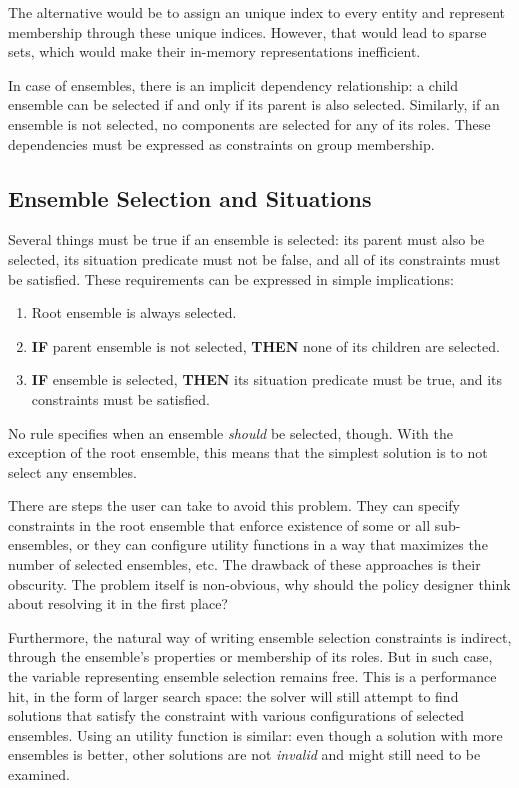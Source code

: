 The alternative would be to assign an unique index to every entity and represent
membership through these unique indices. However, that would lead to sparse sets, which
would make their in-memory representations inefficient.

In case of ensembles, there is an implicit dependency relationship: a child ensemble can
be selected if and only if its parent is also selected. Similarly, if an ensemble is not
selected, no components are selected for any of its roles. These dependencies must be
expressed as constraints on group membership.


\subsection{Ensemble Selection and Situations}

Several things must be true if an ensemble is selected: its parent must also be
selected, its situation predicate must not be false, and all of its constraints must be
satisfied. These requirements can be expressed in simple implications:

\begin{enumerate}
\item Root ensemble is always selected.
\item \textbf{IF} parent ensemble is not selected, \textbf{THEN} none of its children
    are selected.
\item \textbf{IF} ensemble is selected, \textbf{THEN} its situation predicate must be
    true, and its constraints must be satisfied.
\end{enumerate}

No rule specifies when an ensemble \textit{should} be selected, though. With the
exception of the root ensemble, this means that the simplest solution is to not select
any ensembles.

There are steps the user can take to avoid this problem. They can specify constraints in
the root ensemble that enforce existence of some or all sub-ensembles, or they can
configure utility functions in a way that maximizes the number of selected ensembles,
etc. The drawback of these approaches is their obscurity. The problem itself is
non-obvious, why should the policy designer think about resolving it in the first place?

Furthermore, the natural way of writing ensemble selection constraints is indirect,
through the ensemble's properties or membership of its roles. But in such case, the
variable representing ensemble selection remains free. This is a performance hit, in the
form of larger search space: the solver will still attempt to find solutions that
satisfy the constraint with various configurations of selected ensembles. Using an
utility function is similar: even though a solution with more ensembles is better, other
solutions are not \textit{invalid} and might still need to be examined.

